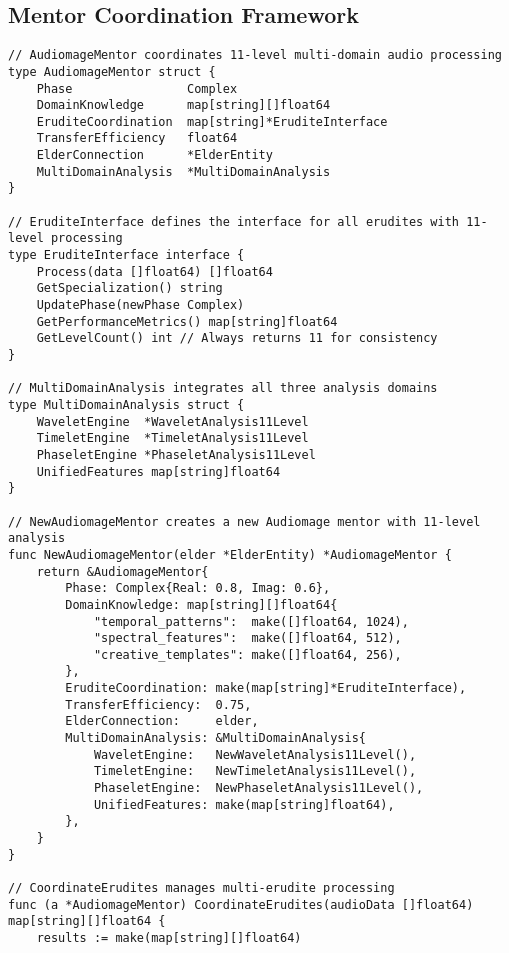 \subsection{Mentor Coordination Framework}

\begin{tcolorbox}[colback=CodeBackground, colframe=DarkGray, title=Audiomage Mentor Implementation, fonttitle=\bfseries]
\begin{verbatim}
// AudiomageMentor coordinates 11-level multi-domain audio processing
type AudiomageMentor struct {
    Phase                Complex
    DomainKnowledge      map[string][]float64
    EruditeCoordination  map[string]*EruditeInterface
    TransferEfficiency   float64
    ElderConnection      *ElderEntity
    MultiDomainAnalysis  *MultiDomainAnalysis
}

// EruditeInterface defines the interface for all erudites with 11-level processing
type EruditeInterface interface {
    Process(data []float64) []float64
    GetSpecialization() string
    UpdatePhase(newPhase Complex)
    GetPerformanceMetrics() map[string]float64
    GetLevelCount() int // Always returns 11 for consistency
}

// MultiDomainAnalysis integrates all three analysis domains
type MultiDomainAnalysis struct {
    WaveletEngine  *WaveletAnalysis11Level
    TimeletEngine  *TimeletAnalysis11Level  
    PhaseletEngine *PhaseletAnalysis11Level
    UnifiedFeatures map[string]float64
}

// NewAudiomageMentor creates a new Audiomage mentor with 11-level analysis
func NewAudiomageMentor(elder *ElderEntity) *AudiomageMentor {
    return &AudiomageMentor{
        Phase: Complex{Real: 0.8, Imag: 0.6},
        DomainKnowledge: map[string][]float64{
            "temporal_patterns":  make([]float64, 1024),
            "spectral_features":  make([]float64, 512),
            "creative_templates": make([]float64, 256),
        },
        EruditeCoordination: make(map[string]*EruditeInterface),
        TransferEfficiency:  0.75,
        ElderConnection:     elder,
        MultiDomainAnalysis: &MultiDomainAnalysis{
            WaveletEngine:   NewWaveletAnalysis11Level(),
            TimeletEngine:   NewTimeletAnalysis11Level(),
            PhaseletEngine:  NewPhaseletAnalysis11Level(),
            UnifiedFeatures: make(map[string]float64),
        },
    }
}

// CoordinateErudites manages multi-erudite processing
func (a *AudiomageMentor) CoordinateErudites(audioData []float64) map[string][]float64 {
    results := make(map[string][]float64)
    

\end{verbatim}
\end{tcolorbox}
